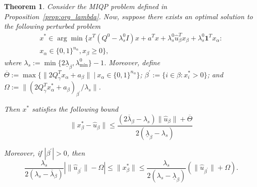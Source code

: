 \documentclass[]{article}
\newtheorem{theorem}{Theorem}
\begin{document}
\begin{theorem} \label{thm:good_lambda}
    Consider the MIQP problem defined in Proposition~\ref{prop:org_lambda}. Now, suppose there exists an optimal solution to the following perturbed problem \[\begin{split}x^*\in\arg\min\{x^T(Q^0-\lambda_{s}^0I)x+a^Tx +\lambda_{s}^0\hat{u}_\beta^Tx_\beta + \lambda_{s}^0\mathbf{1}^T x_\alpha: \\x_\alpha\in\{0,1\}^{n_\alpha}, x_\beta\geq 0\},\end{split}\] 
    where $\lambda_s:=\min\{2\underline{\lambda}_\beta, \lambda_{\min}^0\} - 1$.
    Moreover, define $\overline{\Theta}:=\max\{\|2Q_\gamma^T x_\alpha + a_\beta\|\ |\ x_\alpha \in \{0,1\}^{n_\alpha} \}$; $\beta^\prime:=\{i\in\beta: x_i^* > 0\}$; and $\Omega:= \bigl\|(2Q_\gamma^T x_\alpha^* + a_\beta)_{\beta^\prime}/\lambda_s\bigr\|$.
    
    Then $x^*$ satisfies the following bound
    \[\|x_\beta^*-\hat{u}_\beta\| \leq \frac{(2\overline{\lambda}_\beta - \lambda_s)\|\hat{u}_\beta\| + \overline{\Theta}}{2(\underline{\lambda}_\beta-\lambda_s)}\]
    
    Moreover, if $|\beta^\prime| > 0$, then \[\frac{\lambda_s}{2(\lambda_s - \overline{\lambda}_\beta)}|\|\hat{u}_{\beta^\prime}\| - \Omega| \leq \|x_\beta^*\| \leq \frac{\lambda_s}{2(\lambda_s - \underline{\lambda}_\beta)}(\|\hat{u}_{\beta^\prime}\| + \Omega).\] 
\end{theorem} 
\end{document}
